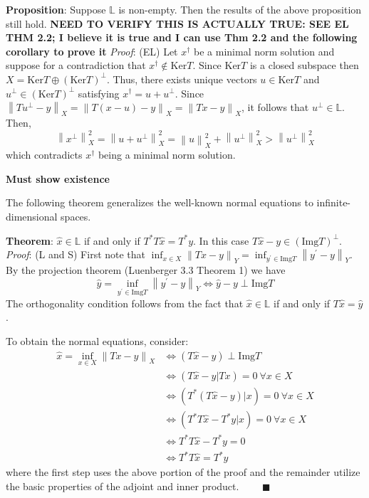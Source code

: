 \documentclass[12pt]{article}
\newcommand*{\norm}[1]{\left\lVert#1\right\rVert}
\newcommand{\Img}{\mathrm{Img}}
\newcommand{\Ker}{\mathrm{Ker}}
\begin{document}
 \textbf{Proposition}: Suppose $\mathbb{L}$ is non-empty. Then the results of the above proposition still hold. 
 \textbf{NEED TO VERIFY THIS IS ACTUALLY TRUE: SEE EL THM 2.2; I believe it is true and I can use Thm 2.2 and the following corollary to prove it}
 \textit{Proof}: (EL) Let $x^\dagger$ be a minimal norm solution and suppose for a contradiction that $x^\dagger \notin \Ker T$. Since $\Ker T$ is a closed subspace then $X = \Ker T \oplus (\Ker T)^\perp$. Thus, there exists unique vectors $u \in \Ker T$ and $u^\perp \in (\Ker T)^\perp$ satisfying $x^\dagger = u + u^\perp$. Since $\norm{Tu^\perp - y}_X = \norm{T(x - u) - y}_X = \norm{Tx - y}_X$, it follows that $u^\perp \in \mathbb{L}$. Then, \[\norm{x^\perp}_{X}^{2} = \norm{u + u^\perp}_{X}^{2} = \norm{u}_{X}^{2} + \norm{u^\perp}_{X}^{2} > \norm{u^\perp}_{X}^{2}\]
 which contradicts $x^\dagger$ being a minimal norm solution. 
 
 \smallskip 
 
\textbf{Must show existence} 

\medskip

The following theorem generalizes the well-known normal equations to infinite-dimensional spaces. 

\textbf{Theorem}: $\hat{x} \in \mathbb{L}$ if and only if $T^* T\hat{x} = T^* y$. In this case $T\hat{x} - y \in (\Img T)^\perp$. \\[.1cm] 

\textit{Proof}: (L and S) First note that $\inf_{x \in X} \norm{Tx - y}_Y = \inf_{y^\prime \in \Img T} \norm{y^\prime - y}_Y$. By the projection theorem (Luenberger 3.3 Theorem 1) we have \[\hat{y} = \inf_{y^\prime \in \Img T} \norm{y^\prime - y}_Y \iff \hat{y} - y \perp \Img T\] 
The orthogonality condition follows from the fact that $\hat{x} \in \mathbb{L}$ if and only if $T\hat{x} = \hat{y}$. 

\smallskip

To obtain the normal equations, consider: 
\begin{align*} 
\hat{x} = \inf_{x \in X} \norm{Tx - y}_X &\iff (T\hat{x} - y) \perp \Img T \\
                                                            &\iff (T\hat{x} - y| Tx) = 0 \ \forall x \in X \\
                                                            &\iff (T^*(T\hat{x} - y)| x) = 0 \ \forall x \in X \\
                                                            &\iff (T^*T\hat{x} - T^*y| x) = 0 \ \forall x \in X \\
                                                            &\iff T^*T\hat{x} - T^*y = 0 \\
                                                            &\iff T^*T\hat{x} = T^*y                                                            
\end{align*} 
where the first step uses the above portion of the proof and the remainder utilize the basic properties of the adjoint and inner product. $\qquad \blacksquare$
 
\end{document}
